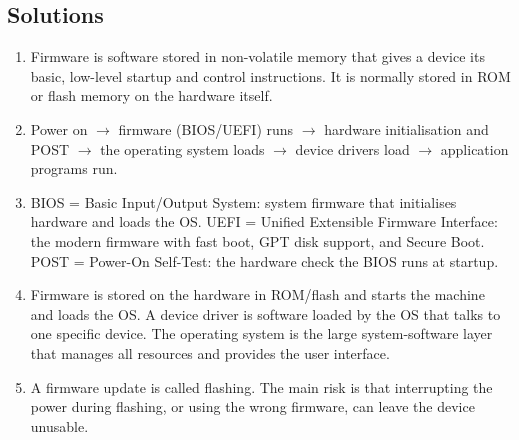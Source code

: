 \documentclass[11pt]{article}
\begin{document}
\subsection*{Solutions}
\begingroup\small
\begin{enumerate}[label=\arabic*.]
  \item Firmware is software stored in non-volatile memory that gives a
    device its basic, low-level startup and control instructions. It is
    normally stored in ROM or flash memory on the hardware itself.
  \item Power on $\rightarrow$ firmware (BIOS/UEFI) runs $\rightarrow$
    hardware initialisation and POST $\rightarrow$ the operating system
    loads $\rightarrow$ device drivers load $\rightarrow$ application
    programs run.
  \item BIOS = Basic Input/Output System: system firmware that initialises
    hardware and loads the OS. UEFI = Unified Extensible Firmware Interface:
    the modern firmware with fast boot, GPT disk support, and Secure Boot.
    POST = Power-On Self-Test: the hardware check the BIOS runs at startup.
  \item Firmware is stored on the hardware in ROM/flash and starts the
    machine and loads the OS. A device driver is software loaded by the OS
    that talks to one specific device. The operating system is the large
    system-software layer that manages all resources and provides the user
    interface.
  \item A firmware update is called flashing. The main risk is that
    interrupting the power during flashing, or using the wrong firmware, can
    leave the device unusable.
\end{enumerate}
\endgroup
\end{document}
